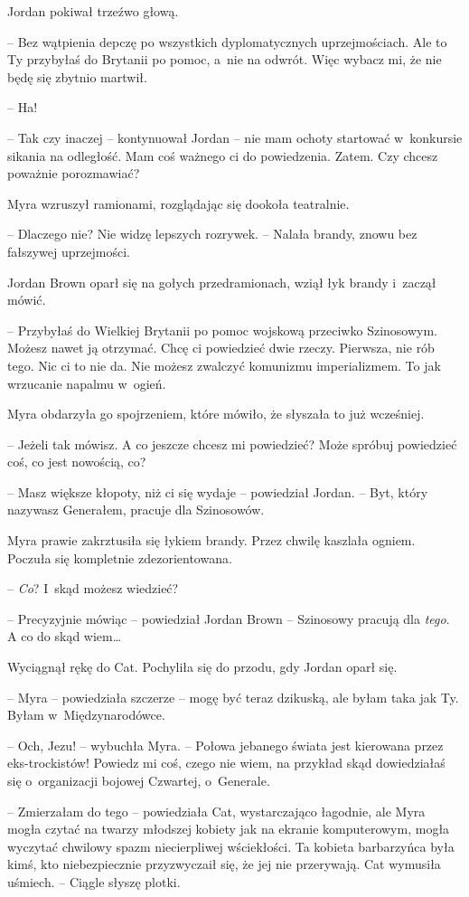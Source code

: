 \documentclass[oneside,polish,11pt,sfheadings]{mwbk}
\begin{document}
Jordan pokiwał trzeźwo głową. 

-- Bez wątpienia depczę po wszystkich
dyplomatycznych uprzejmościach. Ale to Ty przybyłaś do Brytanii po
pomoc, a~nie na odwrót. Więc wybacz mi, że nie będę się zbytnio martwił.

-- Ha!

-- Tak czy inaczej -- kontynuował Jordan -- nie mam ochoty startować w~konkursie sikania na odległość. Mam coś ważnego ci do powiedzenia.
Zatem. Czy chcesz poważnie porozmawiać?

Myra wzruszył ramionami, rozglądając się dookoła teatralnie. 

-- Dlaczego
nie? Nie widzę lepszych rozrywek. -- Nalała brandy, znowu bez fałszywej
uprzejmości.

Jordan Brown oparł się na gołych przedramionach, wziął łyk brandy i~zaczął mówić.

-- Przybyłaś do Wielkiej Brytanii po pomoc wojskową przeciwko Szinosowym.
Możesz nawet ją otrzymać. Chcę ci powiedzieć dwie rzeczy. Pierwsza, nie
rób tego. Nic ci to nie da. Nie możesz zwalczyć komunizmu imperializmem.
To jak wrzucanie napalmu w~ogień.

Myra obdarzyła go spojrzeniem, które mówiło, że słyszała to już
wcześniej. 

-- Jeżeli tak mówisz. A co jeszcze chcesz mi powiedzieć? Może
spróbuj powiedzieć coś, co jest nowością, co?

-- Masz większe kłopoty, niż ci się wydaje -- powiedział Jordan. -- Byt,
który nazywasz Generałem, pracuje dla Szinosowów.

Myra prawie zakrztusiła się łykiem brandy. Przez chwilę kaszlała ogniem.
Poczuła się kompletnie zdezorientowana.

-- \textit{Co}? I~skąd możesz wiedzieć?

-- Precyzyjnie mówiąc -- powiedział Jordan Brown -- Szinosowy pracują dla
\textit{tego}. A co do skąd wiem\ldots

Wyciągnął rękę do Cat. Pochyliła się do przodu, gdy Jordan oparł się.

-- Myra -- powiedziała szczerze -- mogę być teraz dzikuską, ale byłam taka
jak Ty. Byłam w~Międzynarodówce.

-- Och, Jezu! -- wybuchła Myra. -- Połowa jebanego świata jest kierowana
przez eks-trockistów! Powiedz mi coś, czego nie wiem, na przykład skąd
dowiedziałaś się o~organizacji bojowej Czwartej, o~Generale.

-- Zmierzałam do tego -- powiedziała Cat, wystarczająco łagodnie, ale Myra
mogła czytać na twarzy młodszej kobiety jak na ekranie komputerowym,
mogła wyczytać chwilowy spazm niecierpliwej wściekłości. Ta kobieta
barbarzyńca była kimś, kto niebezpiecznie przyzwyczaił się, że jej nie
przerywają. Cat wymusiła uśmiech. -- Ciągle słyszę plotki.
\end{document}
